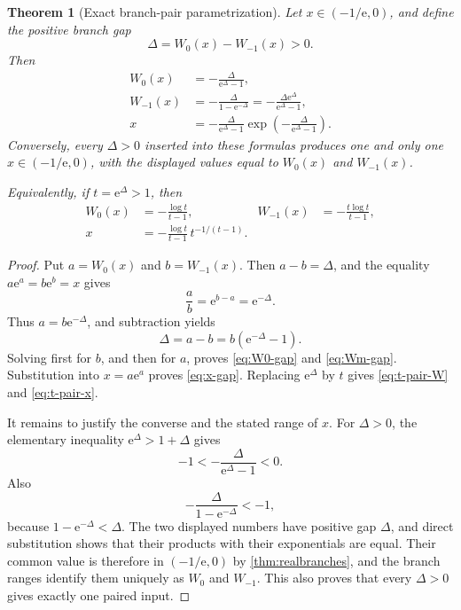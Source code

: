 \documentclass[11pt]{article}
\newtheorem{theorem}{Theorem}[section]
\theoremstyle{remark}
\newcommand{\Wz}{W_0}
\newcommand{\Wm}{W_{-1}}
\newcommand{\ee}{\mathrm e}
\begin{document}
\begin{theorem}[Exact branch-pair parametrization]\label{thm:pairing}
Let \(x\in(-1/\ee,0)\), and define the positive branch gap
\begin{equation}\label{eq:branchgap}
       \Delta=\Wz(x)-\Wm(x)>0.
\end{equation}
Then
\begin{align}
 \Wz(x)&=-\frac{\Delta}{\ee^\Delta-1},
 \label{eq:W0-gap}\\
 \Wm(x)&=-\frac{\Delta}{1-\ee^{-\Delta}}
       =-\frac{\Delta\ee^\Delta}{\ee^\Delta-1},
 \label{eq:Wm-gap}\\
 x&=-\frac{\Delta}{\ee^\Delta-1}
       \exp\left(-\frac{\Delta}{\ee^\Delta-1}\right).
 \label{eq:x-gap}
\end{align}
Conversely, every \(\Delta>0\) inserted into these formulas produces one
and only one \(x\in(-1/\ee,0)\), with the displayed values equal to
\(\Wz(x)\) and \(\Wm(x)\).

Equivalently, if \(t=\ee^\Delta>1\), then
\begin{align}
 \Wz(x)&=-\frac{\log t}{t-1},&
 \Wm(x)&=-\frac{t\log t}{t-1},
 \label{eq:t-pair-W}\\
 x&=-\frac{\log t}{t-1}\,t^{-1/(t-1)}.
 \label{eq:t-pair-x}
\end{align}
\end{theorem}

\begin{proof}
Put \(a=\Wz(x)\) and \(b=\Wm(x)\).  Then
\(a-b=\Delta\), and the equality \(a\ee^a=b\ee^b=x\) gives
\[
       \frac{a}{b}=\ee^{b-a}=\ee^{-\Delta}.
\]
Thus \(a=b\ee^{-\Delta}\), and subtraction yields
\[
 \Delta=a-b=b(\ee^{-\Delta}-1).
\]
Solving first for \(b\), and then for \(a\), proves
\eqref{eq:W0-gap} and \eqref{eq:Wm-gap}.  Substitution into
\(x=a\ee^a\) proves \eqref{eq:x-gap}.  Replacing
\(\ee^\Delta\) by \(t\) gives \eqref{eq:t-pair-W} and
\eqref{eq:t-pair-x}.

It remains to justify the converse and the stated range of \(x\).  For
\(\Delta>0\), the elementary inequality \(\ee^\Delta>1+\Delta\)
gives
\[
       -1<-\frac{\Delta}{\ee^\Delta-1}<0.
\]
Also
\[
 -\frac{\Delta}{1-\ee^{-\Delta}}<-1,
\]
because \(1-\ee^{-\Delta}<\Delta\).  The two displayed numbers have
positive gap \(\Delta\), and direct substitution shows that their products
with their exponentials are equal.  Their common value is therefore in
\((-1/\ee,0)\) by \cref{thm:realbranches}, and the branch ranges identify
them uniquely as \(W_0\) and \(W_{-1}\).  This also proves that every
\(\Delta>0\) gives exactly one paired input.
\end{proof}
\end{document}
